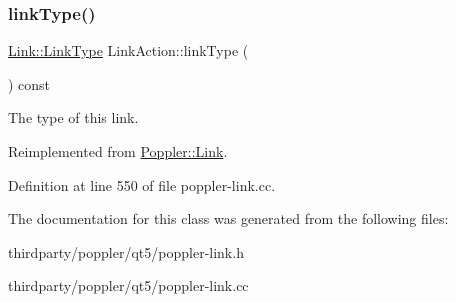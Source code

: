 \subsubsection{\texorpdfstring{link\+Type()}{linkType()}}
{\footnotesize\ttfamily \hyperlink{class_poppler_1_1_link_af0dacfa77a548bb043dbae4bb9dc6c1e}{Link\+::\+Link\+Type} Link\+Action\+::link\+Type (\begin{DoxyParamCaption}{ }\end{DoxyParamCaption}) const\hspace{0.3cm}{\ttfamily [virtual]}}

The type of this link. 

Reimplemented from \hyperlink{class_poppler_1_1_link_a3e3ad7e8867e255c24b9a562bad596ed}{Poppler\+::\+Link}.



Definition at line 550 of file poppler-\/link.\+cc.



The documentation for this class was generated from the following files\+:\begin{DoxyCompactItemize}
\item 
thirdparty/poppler/qt5/poppler-\/link.\+h\item 
thirdparty/poppler/qt5/poppler-\/link.\+cc\end{DoxyCompactItemize}
